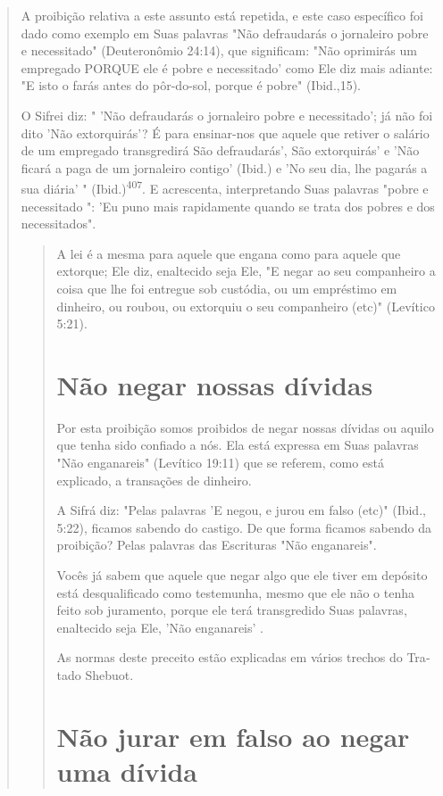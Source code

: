 \begin{quote}
A proibição relativa a este assunto está repetida, e este caso
específi­co foi dado como exemplo em Suas palavras "Não defraudarás o
jornaleiro po­bre e necessitado" (Deuteronômio 24:14), que significam:
"Não oprimirás um empregado PORQUE ele é pobre e necessitado' como Ele
diz mais adiante: "E isto o farás antes do pôr-do-sol, porque é pobre"
(Ibid.,15).

O Sifrei diz: " 'Não defraudarás o jornaleiro pobre e necessitado'; já
não foi dito 'Não extorquirás'? É para ensinar-nos que aquele que
retiver o salá­rio de um empregado transgredirá São defraudarás', São
extorquirás' e 'Não ficará a paga de um jornaleiro contigo' (Ibid.) e
'No seu dia, lhe pagarás a sua diária' " 
(Ibid.)\textsuperscript{407}. E acrescenta, interpretando Suas
palavras "pobre e necessitado
": 'Eu puno mais rapidamente quando se trata dos pobres e dos
necessitados".

\begin{quote}
A lei é a mesma para aquele que engana como para aquele que extor­que;
Ele diz, enaltecido seja Ele, "E negar ao seu companheiro a coisa que
lhe foi entregue sob custódia, ou um empréstimo em dinheiro, ou roubou,
ou ex­torquiu o seu companheiro (etc)" (Levítico 5:21).

\section{Não negar nossas dívidas}

Por esta proibição somos proibidos de negar nossas dívidas ou aqui­lo
que tenha sido confiado a nós. Ela está expressa em Suas palavras "Não
en­ganareis" (Levítico 19:11) que se referem, como está explicado, a
transações de dinheiro.

A Sifrá diz: "Pelas palavras 'E negou, e jurou em falso (etc)" (Ibid.,
5:22), ficamos sabendo do castigo. De que forma ficamos sabendo da
proibi­ção? Pelas palavras das Escrituras "Não enganareis".

Vocês já sabem que aquele que negar algo que ele tiver em depósito está
desqualificado como testemunha, mesmo que ele não o tenha feito sob
juramento, porque ele terá transgredido Suas palavras, enaltecido seja
Ele, 'Não enganareis' .

As normas deste preceito estão explicadas em vários trechos do Tra­tado
Shebuot.

\section{Não jurar em falso ao negar uma dívida}


\end{quote}
\end{quote}
